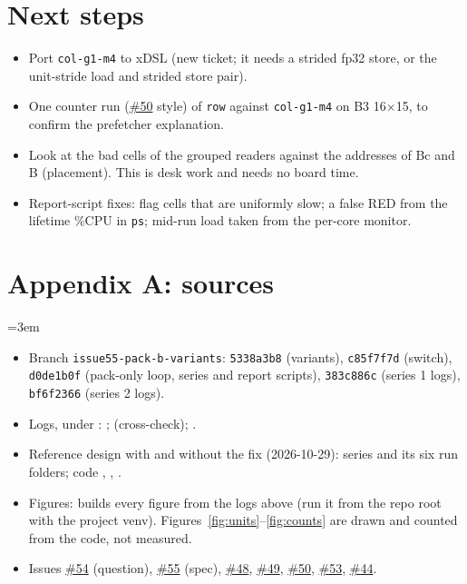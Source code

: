 \documentclass[10pt,a4paper]{article}
\newcommand{\iss}[1]{\href{https://github.com/JieGH/RVV_code_gen_via_MLIR_xDSL/issues/#1}{\##1}}
\begin{document}
\section{Next steps}
\begin{itemize}
  \item Port \texttt{col-g1-m4} to xDSL (new ticket; it needs a strided fp32 store, or the unit-stride load and strided store pair).
  \item One counter run (\iss{50} style) of \texttt{row} against \texttt{col-g1-m4} on B3 16$\times$15, to confirm the prefetcher explanation.
  \item Look at the bad cells of the grouped readers against the addresses of Bc and B (placement). This is desk work and needs no board time.
  \item Report-script fixes: flag cells that are uniformly slow; a false RED from the lifetime \%CPU in \texttt{ps}; mid-run load taken
  from the per-core monitor.
\end{itemize}

\section*{Appendix A: sources}
\raggedright\emergencystretch=3em
\begin{itemize}
  \item Branch \texttt{issue55-pack-b-variants}: \texttt{5338a3b8} (variants), \texttt{c85f7f7d} (switch), \texttt{d0de1b0f} (pack-only loop, series
  and report scripts), \texttt{383c886c} (series 1 logs), \texttt{bf6f2366} (series 2 logs).
  \item Logs, under : ;
   (cross-check);
  .
  \item Reference design with and without the fix (2026-10-29): series  and its six
   run folders; code , ,
  .
  \item Figures:  builds every figure from the logs above (run it from the
  repo root with the project venv). Figures~\ref{fig:units}--\ref{fig:counts} are drawn and counted from the code, not measured.
  \item Issues \iss{54} (question), \iss{55} (spec), \iss{48}, \iss{49}, \iss{50}, \iss{53}, \iss{44}.
\end{itemize}
\end{document}
